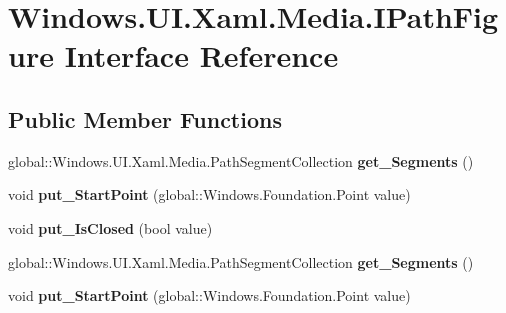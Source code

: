\hypertarget{interface_windows_1_1_u_i_1_1_xaml_1_1_media_1_1_i_path_figure}{}\section{Windows.\+U\+I.\+Xaml.\+Media.\+I\+Path\+Figure Interface Reference}
\label{interface_windows_1_1_u_i_1_1_xaml_1_1_media_1_1_i_path_figure}
\subsection*{Public Member Functions}
\begin{DoxyCompactItemize}
\item 
\mbox{\label{interface_windows_1_1_u_i_1_1_xaml_1_1_media_1_1_i_path_figure_aaa95457239556a512efb7bb7df39b204}} 
global\+::\+Windows.\+U\+I.\+Xaml.\+Media.\+Path\+Segment\+Collection {\bfseries get\+\_\+\+Segments} ()
\item 
\mbox{\label{interface_windows_1_1_u_i_1_1_xaml_1_1_media_1_1_i_path_figure_a86e0b397f824468c4b41759cb0b0e209}} 
void {\bfseries put\+\_\+\+Start\+Point} (global\+::\+Windows.\+Foundation.\+Point value)
\item 
\mbox{\label{interface_windows_1_1_u_i_1_1_xaml_1_1_media_1_1_i_path_figure_a2a7fff536acc439d89e076c7b412848f}} 
void {\bfseries put\+\_\+\+Is\+Closed} (bool value)
\item 
\mbox{\label{interface_windows_1_1_u_i_1_1_xaml_1_1_media_1_1_i_path_figure_aaa95457239556a512efb7bb7df39b204}} 
global\+::\+Windows.\+U\+I.\+Xaml.\+Media.\+Path\+Segment\+Collection {\bfseries get\+\_\+\+Segments} ()
\item 
\mbox{\label{interface_windows_1_1_u_i_1_1_xaml_1_1_media_1_1_i_path_figure_a86e0b397f824468c4b41759cb0b0e209}} 
void {\bfseries put\+\_\+\+Start\+Point} (global\+::\+Windows.\+Foundation.\+Point value)
\item 
\mbox{\label{interface_windows_1_1_u_i_1_1_xaml_1_1_media_1_1_i_path_figure_a2a7fff536acc439d89e076c7b412848f}} 

\end{DoxyCompactItemize}
